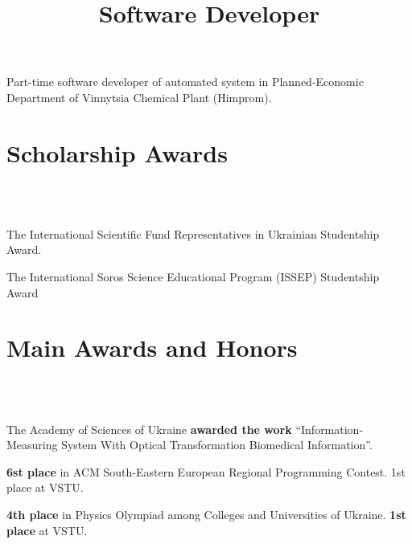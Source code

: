 \documentclass[10pt, overlapped, line]{res}
\newcommand{\mplace}[1]{{\bf #1}}
\begin{document}
\begin{resume}
\title{Software Developer}
\begin{position}
Part-time software developer of automated system in
Planned-Economic Department of Vinnytsia Chemical Plant (Himprom).
\end{position}

\section{Scholarship Awards}
\begin{format}
   \\ 
  \body\\
\end{format}

\begin{position}
 The International Scientific Fund Representatives in Ukrainian Studentship Award. 
\end{position}

\begin{position}
 The International Soros Science Educational Program (ISSEP) Studentship Award
\end{position}


\section{Main Awards and Honors}
\begin{format}
  \\ 
  \body\\
\end{format}

\begin{position}
  The Academy of Sciences of Ukraine \mplace{awarded the work}
  ``Information-Measuring System With Optical Transformation
  Biomedical Information''.
\end{position}

\begin{position}
  \mplace{6st place} in ACM South-Eastern European Regional
  Programming Contest. 1st place at VSTU.
\end{position}

\begin{position}
  \mplace{4th place} in Physics Olympiad among Colleges and
  Universities of Ukraine. \mplace{1st place} at VSTU.
\end{position}


\end{resume}
\end{document}

